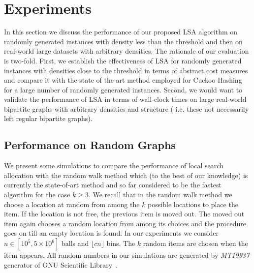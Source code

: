 \section{Experiments}

In this section we discuss the performance of our proposed LSA algorithm on randomly generated instances with density less than the threshold and then on real-world large datasets with arbitrary densities.
 The rationale of our evaluation is two-fold. First, we establish the effectiveness of LSA for randomly generated instances with densities close to the threshold in terms of abstract cost measures and compare it with the state of the art method employed for Cuckoo Hashing for a large number of randomly generated instances. Second, we would want to validate the performance of LSA in terms of wall-clock times on large real-world bipartite graphs with arbitrary densities and structure ( i.e. these not necessarily left regular bipartite graphs). 
 
\subsection{Performance on Random Graphs}

We present some simulations to compare the performance of local search allocation with the random walk method which (to the best of our knowledge) is currently the state-of-art method and so far considered to be the fastest algorithm for the case $k\ge 3$. We recall that in the random walk method we choose a location at random from among the $k$ possible locations to place the item. If the location is not free, the previous item is moved out.  The moved out item again chooses a random location from among its choices and the procedure goes on till an empty location is found. In our experiments we consider $n\in [10^5, 5\times 10^6]$ balls and $\lfloor cn \rfloor$ bins. The $k$ random items are chosen when the item appears. All random numbers in our simulations are generated by \emph{MT19937} generator of GNU Scientific Library~\cite{gnu}. 

